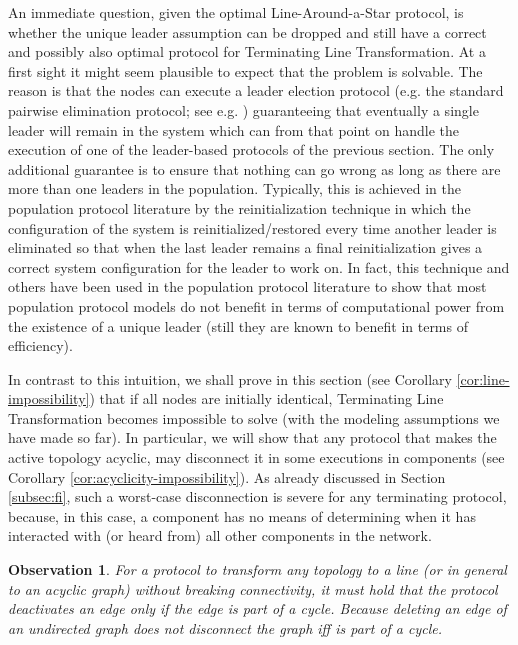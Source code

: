 \documentclass[preprint]{elsarticle}
\newtheorem{observation}{Observation}
\begin{document}
An immediate question, given the optimal Line-Around-a-Star protocol, is whether the unique leader assumption can be dropped and still have a correct and possibly also optimal protocol for Terminating Line Transformation. At a first sight it might seem plausible to expect that the problem is solvable. The reason is that the nodes can execute a leader election protocol (e.g. the standard pairwise elimination protocol; see e.g. \cite{AR09}) guaranteeing that eventually a single leader will remain in the system which can from that point on handle the execution of one of the leader-based protocols of the previous section. The only additional guarantee is to ensure that nothing can go wrong as long as there are more than one leaders in the population. Typically, this is achieved in the population protocol literature by the reinitialization technique in which the configuration of the system is reinitialized/restored every time another leader is eliminated so that when the last leader remains a final reinitialization gives a correct system configuration for the leader to work on. In fact, this technique and others have been used in the population protocol literature to show that most population protocol models do not benefit in terms of computational power from the existence of a unique leader (still they are known to benefit in terms of efficiency). 

In contrast to this intuition, we shall prove in this section (see Corollary \ref{cor:line-impossibility}) that if all nodes are initially identical, Terminating Line Transformation becomes impossible to solve (with the modeling assumptions we have made so far). In particular, we will show that any protocol that makes the active topology acyclic, may disconnect it in some executions in  components (see Corollary \ref{cor:acyclicity-impossibility}). As already discussed in Section \ref{subsec:fi}, such a worst-case disconnection is severe for any terminating protocol, because, in this case, a component has no means of determining when it has interacted with (or heard from) all other components in the network.  

\begin{observation}
For a protocol to transform any topology to a line (or in general to an acyclic graph) without breaking connectivity, it must hold that the protocol deactivates an edge only if the edge is part of a cycle. Because deleting an edge  of an undirected graph does
not disconnect the graph iff  is part of a cycle.
\end{observation}
\end{document}
